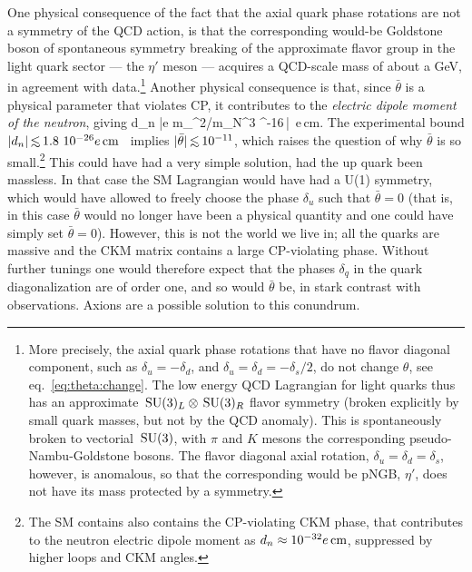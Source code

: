 One physical consequence of the fact that the axial quark phase rotations are not a symmetry of
the QCD action, is that the corresponding would-be Goldstone boson of spontaneous symmetry breaking of the approximate flavor group in the light quark sector  --- the $\eta'$ meson --- acquires a QCD-scale mass of about a GeV,
in agreement with data.\footnote{More precisely, the axial quark phase rotations that have no flavor diagonal component, such as $\delta_u=-\delta_d$, and $\delta_u=\delta_d=-\delta_s/2$, do not change $\theta$, see eq.~\eqref{eq:theta:change}. The low energy QCD Lagrangian for light quarks thus has an approximate $\,{\rm SU}(3)_L\otimes \,{\rm SU}(3)_R$ flavor symmetry (broken explicitly by small quark masses, but not by the QCD anomaly). This is spontaneously broken to vectorial $\,{\rm SU}(3)$, with $\pi$ and $K$ mesons the corresponding pseudo-Nambu-Goldstone bosons. The flavor diagonal axial rotation, $\delta_u=\delta_d=\delta_s$, however, is anomalous, so that the corresponding would be pNGB, $\eta'$, does not have its mass protected by a symmetry.   }
 Another
physical consequence is that, since $\bar\theta$ is a physical parameter that violates CP, it contributes to the {\em electric dipole moment of the neutron}, giving \cite{neutron:EDM:th}
\beq 
d_n \approx \bar\theta e m_\pi^2/m_N^3 ^{-16}\,\bar\theta\, e\,{\rm cm}.
\eeq
The experimental bound $|d_n| \circa{<} 1.8~10^{-26}e\cm$~\cite{2001.11966} implies 
$|\bar\theta|\circa{<} 10^{-11}$, which raises the question of why $\bar\theta$ is so small.\footnote{The SM contains also contains the CP-violating CKM phase,
that contributes to the
neutron electric dipole moment as $d_n \approx 10^{-32} e\,{\rm  cm}$, suppressed by higher loops and CKM angles.} 
This could have had a very simple solution, had the up quark been massless. In that case the SM Lagrangian would have had a U(1) symmetry,
which would have allowed to freely choose the phase
$\delta_u$ such that $\bar \theta=0$ (that is, in this case $\bar \theta$ would no longer have been a physical quantity and one could have simply set $\bar\theta=0$).
However, this is not the world we live in; all the quarks are massive and the CKM matrix contains a large CP-violating
phase. Without further tunings one would therefore expect that the phases $\delta_q$ in the quark diagonalization are of order one, and so would $\bar \theta$ be, in stark contrast with observations. 
Axions are a possible solution to this conundrum.

